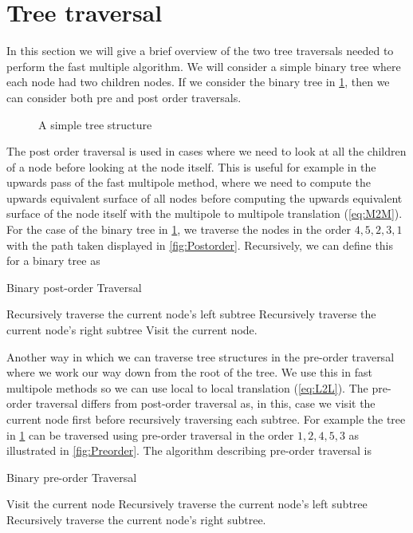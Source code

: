 \section{Tree traversal}\label{appendix:Tree}
In this section we will give a brief overview of the two tree traversals needed to perform the fast multiple algorithm. We will consider a simple binary tree where each node had two children nodes. If we consider the binary tree in \cref{fig:BlankTree}, then we can consider both pre and post order traversals.
\begin{figure}[ht]
    \centering
    \resizebox{.4\linewidth}{!}{}
    \caption{A simple tree structure}
    \label{fig:BlankTree}
\end{figure}
The post order traversal is used in cases where we need to look at all the children of a node before looking at the node itself. This is useful for example in the upwards pass of the fast multipole method, where we need to compute the upwards equivalent surface of all nodes before computing the upwards equivalent surface of the node itself with the multipole to multipole translation (\cref{eq:M2M}). For the case of the binary tree in \cref{fig:BlankTree}, we traverse the nodes in the order $4, 5, 2, 3, 1$ with the path taken displayed in \cref{fig:Postorder}. Recursively, we can define this for a binary tree as
\begin{algorithm}
\caption{Binary post-order Traversal}
\begin{algorithmic}[1]
\State Recursively traverse the current node's left subtree
\State Recursively traverse the current node's right subtree
\State Visit the current node.
\end{algorithmic}
\end{algorithm}


Another way in which we can traverse tree structures in the pre-order traversal where we work our way down from the root of the tree. We use this in fast multipole methods so we can use local to local translation (\cref{eq:L2L}). The pre-order traversal differs from post-order traversal as, in this, case we visit the current node first before recursively traversing each subtree. For example the tree in \cref{fig:BlankTree} can be traversed using pre-order traversal in the order $1, 2, 4, 5, 3$ as illustrated in \cref{fig:Preorder}. The algorithm describing pre-order traversal is
\begin{algorithm}
\caption{Binary pre-order Traversal}
\begin{algorithmic}[1]
\State Visit the current node
\State Recursively traverse the current node's left subtree
\State Recursively traverse the current node's right subtree.
\end{algorithmic}
\end{algorithm}

